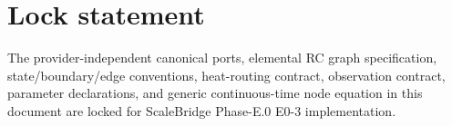 \documentclass[11pt]{article}
\begin{document}
\section*{Lock statement}
The provider-independent canonical ports, elemental RC graph specification, state/boundary/edge conventions, heat-routing contract, observation contract, parameter declarations, and generic continuous-time node equation in this document are locked for ScaleBridge Phase-E.0 E0-3 implementation.
\end{document}
